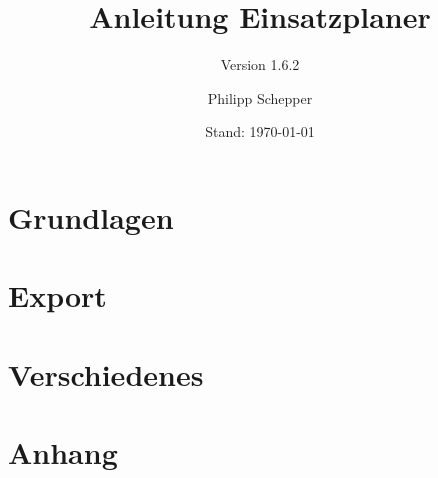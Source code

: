\documentclass[a4paper,ngerman,oneside]{scrbook}
\title{Anleitung Einsatzplaner}
\subtitle{Version 1.6.2}
\author{Philipp Schepper}
\date{Stand: \today}
\begin{document}
\maketitle

\frontmatter
\tableofcontents


\mainmatter
\part{Grundlagen}





\part{Export}


\part{Verschiedenes}



\appendix
\part{Anhang}



\end{document}
